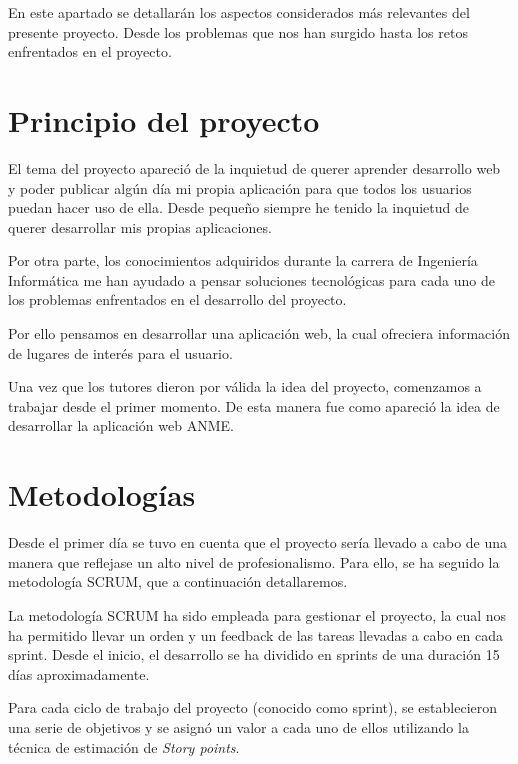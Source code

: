 
En este apartado se detallarán los aspectos considerados más relevantes del presente proyecto. Desde los problemas  que nos han surgido hasta los retos enfrentados en el proyecto.

\section{Principio del proyecto}

El tema del proyecto apareció de la inquietud de querer aprender desarrollo web y poder publicar algún día mi propia aplicación para que todos los usuarios puedan hacer uso de ella. Desde pequeño siempre he tenido la inquietud de querer desarrollar mis propias aplicaciones.

Por otra parte, los conocimientos adquiridos durante la carrera de Ingeniería Informática me han ayudado a pensar soluciones tecnológicas para cada uno de los problemas enfrentados en el desarrollo del proyecto.

Por ello pensamos en desarrollar una aplicación web, la cual ofreciera información de lugares de interés para el usuario.

Una vez que los tutores dieron por válida la idea del proyecto, comenzamos a trabajar desde el primer momento. De esta manera fue como apareció la idea de desarrollar la aplicación web ANME.


\section{Metodologías}

Desde el primer día se tuvo en cuenta que el proyecto sería llevado a cabo de una manera que reflejase un alto nivel de profesionalismo. Para ello, se ha seguido la metodología SCRUM, que a continuación detallaremos.

La metodología SCRUM ha sido empleada para gestionar el proyecto, la cual nos ha permitido llevar un orden y un feedback de las tareas llevadas a cabo en cada sprint. Desde el inicio, el desarrollo se ha dividido en sprints de una duración 15 días aproximadamente.

Para cada ciclo de trabajo del proyecto (conocido como sprint), se establecieron una serie de objetivos y se asignó un valor a cada uno de ellos utilizando la técnica de estimación de \textit{Story points}.

